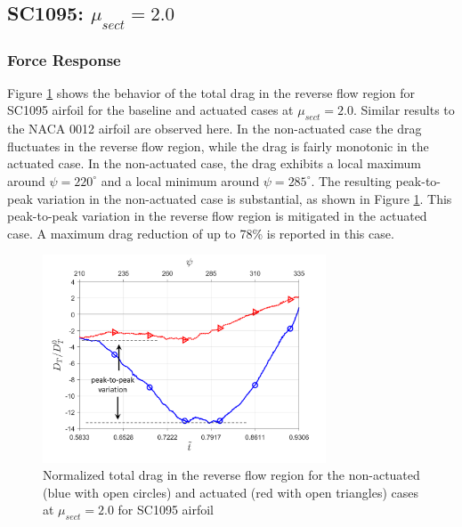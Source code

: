 \subsection{SC1095: $\mu_{sect}=2.0$}

\subsubsection{Force Response}

Figure \ref{fig:total_drag_zoomed_mu_2pt0_SC1095} shows the behavior of the total drag in the reverse flow region for SC1095 airfoil for the baseline and actuated cases at $\mu_{sect}=2.0$. 
Similar results to the NACA 0012 airfoil are observed here.
In the non-actuated case the drag fluctuates in the reverse flow region, while the drag is fairly monotonic in the actuated case.
In the non-actuated case, the drag exhibits a local maximum around $\psi=220^\circ$ and a local minimum around $\psi=285^\circ$.
The resulting peak-to-peak variation in the non-actuated case is substantial, as shown in Figure \ref{fig:total_drag_zoomed_mu_2pt0_SC1095}.
This peak-to-peak variation in the reverse flow region is mitigated in the actuated case.
A maximum drag reduction of up to 78\% is reported in this case.


\begin{figure}[H]
	
	\centering
	\includegraphics[width=0.75\textwidth]{figures/SC1095/Zoomed_Drag_tot_SC1095_Re1m_aoa10_2.png}
	\caption{Normalized total drag in the reverse flow region for the non-actuated (blue with open circles) and actuated (red with open triangles) cases at $\mu_{sect}=2.0$ for SC1095 airfoil}
	\label{fig:total_drag_zoomed_mu_2pt0_SC1095}
\end{figure}



